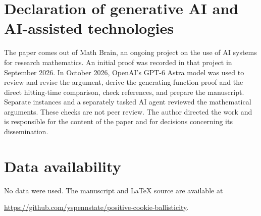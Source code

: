 \documentclass[11pt]{amsart}
\numberwithin{equation}{section}
\theoremstyle{remark}
\begin{document}
\section*{Declaration of generative AI and AI-assisted technologies}
The paper comes out of Math Brain, an ongoing project on the use of AI systems for research mathematics. An initial proof was recorded in that project in September 2026. In October 2026, OpenAI's GPT-6 Astra model was used to review and revise the argument, derive the generating-function proof and the direct hitting-time comparison, check references, and prepare the manuscript. Separate instances and a separately tasked AI agent reviewed the mathematical arguments. These checks are not peer review. The author directed the work and is responsible for the content of the paper and for decisions concerning its dissemination.

\section*{Data availability}
No data were used. The manuscript and LaTeX source are available at\par
\noindent\url{https://github.com/yspennstate/positive-cookie-ballisticity}.
\end{document}
